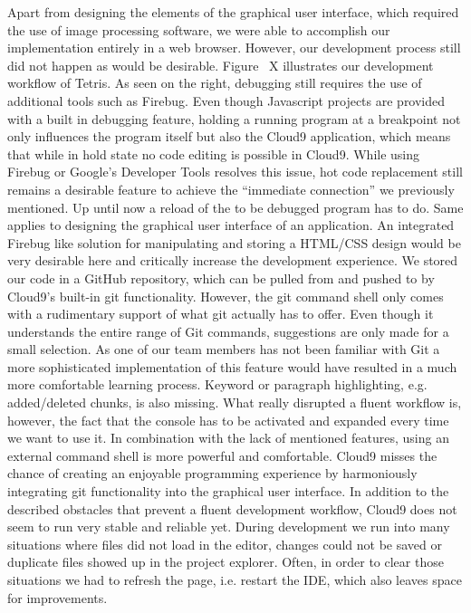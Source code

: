 Apart from designing the elements of the graphical user interface, which required the use of image processing software,
we were able to accomplish our implementation entirely in a web browser.
However, our development process still did not happen as would be desirable.
Figure ~\needcite X illustrates our development workflow of Tetris. As seen on the right, debugging still requires
the use of additional tools such as Firebug. Even though Javascript projects are provided with a built in debugging feature,
holding a running program at a breakpoint not only influences the program itself but also the Cloud9 application,
which means that while in hold state no code editing is possible in Cloud9.
While using Firebug or Google's Developer Tools resolves this issue, hot code replacement still remains a desirable
feature to achieve the ``immediate connection'' we previously mentioned.
Up until now a reload of the to be debugged program has to do. Same applies to designing the graphical user interface of
an application. An integrated Firebug like solution for manipulating and storing a HTML/CSS design would be very desirable
here and critically increase the development experience. We stored our code in a GitHub repository,
which can be pulled from and pushed to by Cloud9's built-in git functionality.
However, the git command shell only comes with a rudimentary support of what git actually has to offer.
Even though it understands the entire range of Git commands, suggestions are only made for a small selection.
As one of our team members has not been familiar with Git a more sophisticated implementation of this feature would have
resulted in a much more comfortable learning process. Keyword or paragraph highlighting, e.g. added/deleted chunks,
is also missing. What really disrupted a fluent workflow is, however, the fact that the console has to be activated and
expanded every time we want to use it. In combination with the lack of mentioned features, using an external command shell
is more powerful and comfortable. Cloud9 misses the chance of creating an enjoyable programming experience by harmoniously
integrating git functionality into the graphical user interface. In addition to the described obstacles that prevent
a fluent development workflow, Cloud9 does not seem to run very stable and reliable yet.
During development we run into many situations where files did not load in the editor, changes could not be saved or
duplicate files showed up in the project explorer. Often, in order to clear those situations we had to refresh the page,
i.e. restart the IDE, which also leaves space for improvements.

